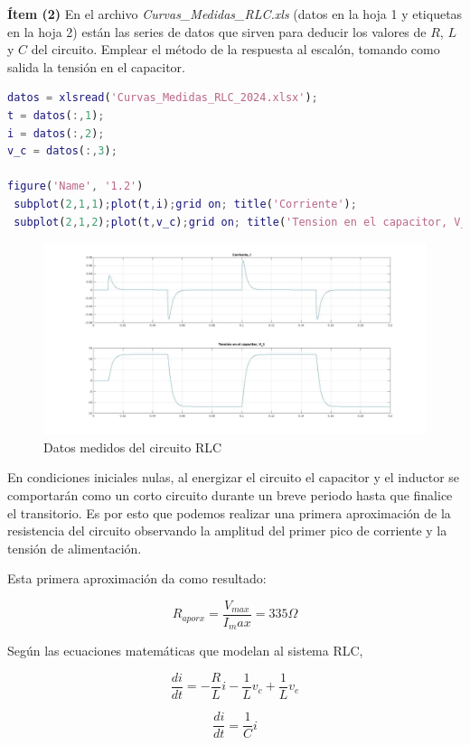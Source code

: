 \documentclass{article}
\begin{document}
\textbf{Ítem (2)} En el archivo \textit{Curvas\_Medidas\_RLC.xls} (datos en la hoja 1 y etiquetas en la hoja 2)
están las series de datos que sirven para deducir los valores de $R$, $L$ y $C$ del circuito. 
Emplear el método de la respuesta al escalón, tomando como salida la tensión en el capacitor.

\begin{lstlisting}[language=matlab]
datos = xlsread('Curvas_Medidas_RLC_2024.xlsx');
t = datos(:,1);
i = datos(:,2);
v_c = datos(:,3);

figure('Name', '1.2')
 subplot(2,1,1);plot(t,i);grid on; title('Corriente');
 subplot(2,1,2);plot(t,v_c);grid on; title('Tension en el capacitor, V_c1');

\end{lstlisting}

\begin{figure}[!h]
  \centering
  \includegraphics[width=1\textwidth]{img/rlc2-1.jpg}
  \caption{Datos medidos del circuito RLC}
\end{figure}

En condiciones iniciales nulas, al energizar el circuito el capacitor y el inductor se comportarán como 
un corto circuito durante un breve periodo hasta que finalice el transitorio. Es por esto que podemos realizar
una primera aproximación de la resistencia del circuito observando la amplitud del primer pico de corriente y la 
tensión de alimentación.

Esta primera aproximación da como resultado:

$$R_{aporx}=\frac{V_{max}}{I_max} = 335\Omega$$

Según las ecuaciones matemáticas que modelan al sistema RLC, 

$$\frac{di}{dt} = -\frac{R}{L}i - \frac{1}{L}v_c +\frac{1}{L}v_e$$

$$\frac{di}{dt} = \frac{1}{C}i$$
\end{document}
